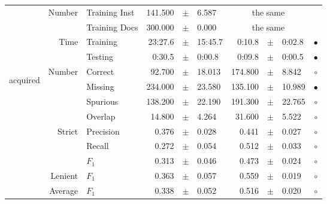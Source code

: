 \begin{longtable}{|r|r|l||rcl|rcl|c|}
\cline{2-10} & \multirow{2}{*}{    Number} &   Training Inst &     141.500 &  $\pm$  &       6.587 &    \multicolumn{3}{c|}{the same}         &  \\
\cline{3-10} &                             &   Training Docs &     300.000 &  $\pm$  &       0.000 &    \multicolumn{3}{c|}{the same}         &  \\
\cline{2-10} & \multirow{2}{*}{      Time} &        Training &     23:27.6 &  $\pm$  &     15:45.7 &      0:10.8 &  $\pm$  &      0:02.8 & $\bullet$ \\
\cline{3-10} &                             &         Testing &      0:30.5 &  $\pm$  &      0:00.8 &      0:09.8 &  $\pm$  &      0:00.5 & $\bullet$ \\
\hline
\hline
\multirow{11}{*}{\begin{sideways}acquired\end{sideways} }
             & \multirow{4}{*}{    Number} &         Correct &      92.700 &  $\pm$  &      18.013 &     174.800 &  $\pm$  &       8.842 & $\circ$ \\
\cline{3-10} &                             &         Missing &     234.000 &  $\pm$  &      23.580 &     135.100 &  $\pm$  &      10.989 & $\bullet$ \\
\cline{3-10} &                             &        Spurious &     138.200 &  $\pm$  &      22.190 &     191.300 &  $\pm$  &      22.765 & $\circ$ \\
\cline{3-10} &                             &         Overlap &      14.800 &  $\pm$  &       4.264 &      31.600 &  $\pm$  &       5.522 & $\circ$ \\
\cline{2-10} & \multirow{3}{*}{    Strict} &       Precision &       0.376 &  $\pm$  &       0.028 &       0.441 &  $\pm$  &       0.027 & $\circ$ \\
\cline{3-10} &                             &          Recall &       0.272 &  $\pm$  &       0.054 &       0.512 &  $\pm$  &       0.033 & $\circ$ \\
\cline{3-10} &                             &           $F_1$ &       0.313 &  $\pm$  &       0.046 &       0.473 &  $\pm$  &       0.024 & $\circ$ \\
\cline{2-10} &                     Lenient &           $F_1$ &       0.363 &  $\pm$  &       0.057 &       0.559 &  $\pm$  &       0.019 & $\circ$ \\
\cline{2-10} &                     Average &           $F_1$ &       0.338 &  $\pm$  &       0.052 &       0.516 &  $\pm$  &       0.020 & $\circ$ \\

\end{longtable}
